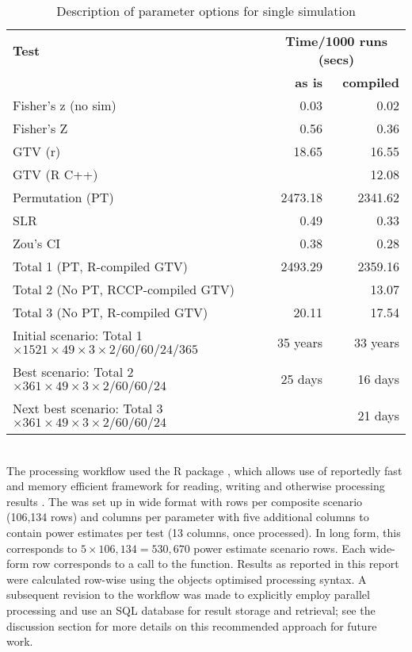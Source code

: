 \begin{table}\centering
\caption{Description of parameter options for single simulation \label{table:times}}
\begin{tabular}{lrr}
  \toprule
  \textbf{Test} &	\multicolumn{2}{c}{\textbf{Time/1000 runs (secs)}} \\
  \cmidrule(lr){2-3} 
   & \textbf{as is} & \textbf{compiled}				\\
  \midrule										
  Fisher's z (no sim) &         0.03 &    0.02 \\
  Fisher's Z          &         0.56 &    0.36 \\
  GTV (r)             &        18.65 &   16.55 \\
  GTV (R C++)         &              &   12.08 \\
  Permutation (PT)    &      2473.18 & 2341.62 \\
  SLR                 &         0.49 &    0.33 \\
  Zou's CI            &         0.38 &    0.28 \\
  \midrule
  \multicolumn{1}{l}{Total 1 (PT, R-compiled GTV)}       &	2493.29 & 2359.16  \\
  \multicolumn{1}{l}{Total 2 (No PT, RCCP-compiled GTV)} &	       	& 13.07    \\
  \multicolumn{1}{l}{Total 3 (No PT, R-compiled GTV)}    & 	20.11	  & 17.54    \\
  \multicolumn{1}{l}{Initial scenario: Total 1 $\times 1521 \times 49 \times 3 \times 2/60/60/24/365$}  & 35 years  & 33 years \\
  \multicolumn{1}{l}{Best scenario: Total 2 $\times 361 \times 49\times 3 \times 2 /60/60/24$}  & 25 days  & 16 days \\
  \multicolumn{1}{l}{Next best scenario: Total 3 $\times 361 \times 49\times 3 \times 2 /60/60/24$}  &    & 21 days \\
\bottomrule 
\end{tabular}
\end{table}
\\
The processing workflow used the R package , which allows use of reportedly fast and memory efficient framework for reading, writing and otherwise processing results \cite{r_dt}.  The  was set up in wide format with rows per composite scenario (106,134 rows) and columns per parameter with five additional columns to contain power estimates per test (13 columns, once processed).  In long form, this corresponds to $5 \times 106,134 = 530,670$ power estimate scenario rows.  Each wide-form row corresponds to a call to the  function. Results as reported in this report were calculated row-wise using the  objects optimised processing syntax.  A subsequent revision to the workflow was made to explicitly employ parallel processing and use an SQL database for result storage and retrieval; see the discussion section for more details on this recommended approach for future work.

